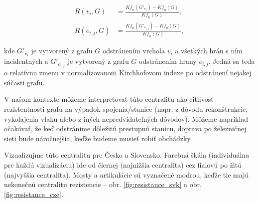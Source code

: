 \documentclass[main.tex]{subfiles}
\begin{document}
\begin{align*}
	R(v_i, G) &=  \frac{\mathit{Kf}_n(G'_{v_i}) - \mathit{Kf}_n(G)}{\mathit{Kf}_n(G)}, \\
	R(e_{i,j}, G) &=  \frac{\mathit{Kf}_n(G'_{e_{i,j}}) - \mathit{Kf}_n(G)}{\mathit{Kf}_n(G)},
\end{align*}

\noindent kde $G'_{v_i}$ je vytvorený z grafu $G$ odstránením vrchola $v_i$ a všetkých hrán s ním incidentných a $G'_{e_{i,j}}$ je vytvorený z grafu $G$ odstránením hrany $e_{i,j}$. Jedná sa teda o relatívnu zmenu v normalizovanom Kirchhofovom indexe po odstránení nejakej súčasti grafu.

V našom kontexte môžeme interpretovať túto centralitu ako citlivosť rezistentnosti grafu na výpadok spojenia/stanice (napr. z dôvodu rekonštrukcie, vykoľajenia vlaku alebo z iných nepredvídateľných dôvodov). Môžeme napríklad očakávať, že keď odstránime dôležitú prestupnú stanicu, doprava po železničnej sieti bude náročnejšia, keďže budeme musieť robiť obchádzky. 

Vizualizujme túto centralitu pre Česko a Slovensko. Farebná škála (individuálna pre každú vizualizáciu) ide od čiernej (najnižšia centralita) cez fialovú po žltú (najvyššia centralita). Mosty a artikulácie sú vyznačené modrou, keďže tie majú nekonečnú centralitu rezistencie -- obr. \ref{fig:resistance_svk} a obr. \ref{fig:resistance_cze}. 
\end{document}
